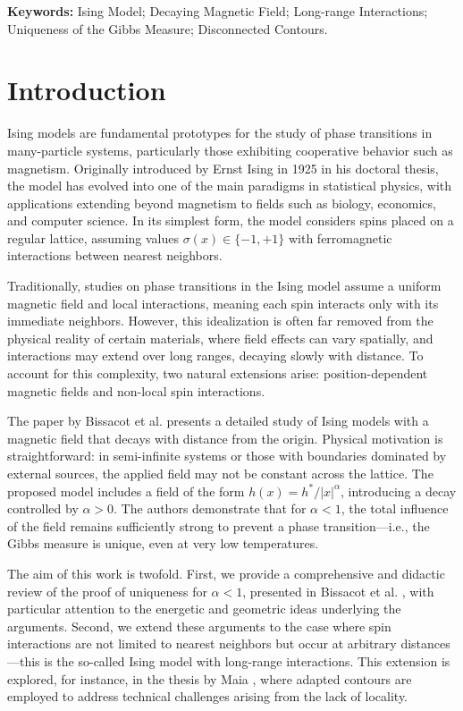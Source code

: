\documentclass{article}
\begin{document}
\vspace{0.5cm}
\noindent\textbf{Keywords:} Ising Model; Decaying Magnetic Field; Long-range Interactions; Uniqueness of the Gibbs Measure; Disconnected Contours.

\section{Introduction}
\hypertarget{pag2}{}
Ising models are fundamental prototypes for the study of phase transitions in many-particle systems, particularly those exhibiting cooperative behavior such as magnetism. Originally introduced by Ernst Ising in 1925 in his doctoral thesis, the model has evolved into one of the main paradigms in statistical physics, with applications extending beyond magnetism to fields such as biology, economics, and computer science. In its simplest form, the model considers spins placed on a regular lattice, assuming values $\sigma(x) \in \{-1,+1\}$ with ferromagnetic interactions between nearest neighbors.

Traditionally, studies on phase transitions in the Ising model assume a uniform magnetic field and local interactions, meaning each spin interacts only with its immediate neighbors. However, this idealization is often far removed from the physical reality of certain materials, where field effects can vary spatially, and interactions may extend over long ranges, decaying slowly with distance. To account for this complexity, two natural extensions arise: position-dependent magnetic fields and non-local spin interactions.

The paper by  Bissacot et al. \cite{bissacot2015} presents a detailed study of Ising models with a magnetic field that decays with distance from the origin. Physical motivation is straightforward: in semi-infinite systems or those with boundaries dominated by external sources, the applied field may not be constant across the lattice. The proposed model includes a field of the form $h(x) = h^*/|x|^\alpha$, introducing a decay controlled by $\alpha>0$. The authors demonstrate that for $\alpha<1$, the total influence of the field remains sufficiently strong to prevent a phase transition—i.e., the Gibbs measure is unique, even at very low temperatures.

\hypertarget{pag3}{}
The aim of this work is twofold. First, we provide a comprehensive and didactic review of the proof of uniqueness for $\alpha<1$, presented in Bissacot et al. \cite{bissacot2015}, with particular attention to the energetic and geometric ideas underlying the arguments. Second, we extend these arguments to the case where spin interactions are not limited to nearest neighbors but occur at arbitrary distances—this is the so-called Ising model with long-range interactions. This extension is explored, for instance, in the thesis by Maia \cite{maia2024}, where adapted contours are employed to address technical challenges arising from the lack of locality.
\end{document}
